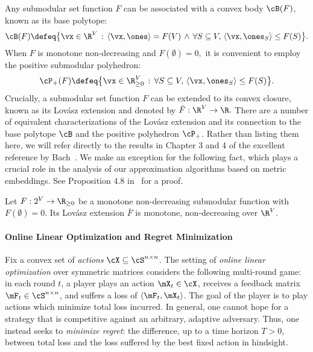 \documentclass[letterpaper]{article}
\begin{document}
Any submodular set function $F$ can be associated with a convex body $\cB(F)$, known as its base polytope:
\begin{equation}
\label{eq.base-polytope-definition}
\cB(F) \defeq \big\{
  \vx \in \R^V \, : \,
  \langle \vx, \ones \rangle = F(V) \, \wedge \,  \forall S \subseteq V,\,
  \langle \vx, \ones_S \rangle \leq F(S)
\big\}.
\end{equation}
When $F$ is monotone non-decreasing and $F(\emptyset) = 0,$ it is convenient to employ the positive submodular polyhedron:
\begin{equation*}
\cP_+(F) \defeq \big\{
  \vx \in \R^V_{\geq 0} \, : \, \forall S \subseteq V,\,
  \langle \vx, \ones_S \rangle \leq F(S) \big\}.
\end{equation*}
Crucially, a submodular set function $F$ can be extended to its convex closure, known as its Lov\'{a}sz extension and denoted by $\bar{F} : \R^V \rightarrow \R.$
There are a number of equivalent characterizations of the Lov\'{a}sz extension and its connection to the base polytope $\cB$ and the positive polyhedron $\cP_+$. Rather than listing them here, we will refer directly to the results in Chapter 3 and 4 of the excellent reference by Bach~\cite{bach2013learning}. We make an exception for the following fact, which plays a crucial role in the analysis of our approximation algorithms based on metric embeddings. See Proposition 4.8 in~\cite{bach2013learning} for a proof.
\begin{fact}\label{fct.lovaszmonotone}
Let $F: 2^V \to \R_{\geq 0}$ be a monotone non-decreasing submodular function with $F(\emptyset) = 0$. Its Lov\'asz extension $\bar{F}$ is monotone, non-decreasing over $\R^V.$
\end{fact}


\paragraph{Online Linear Optimization and Regret Minimization}
Fix a convex set of \emph{actions} $\cX \subseteq \cS^{n \times n}$. The setting of \emph{online linear optimization} over symmetric matrices considers the following multi-round game: in each round $t$, a player plays an action $\mX_t \in \cX$, receives a feedback matrix $\mF_t \in \cS^{n \times n}$, and suffers a loss of $\langle \mF_t, \mX_t \rangle$. The goal of the player is to play actions which minimize total loss incurred. In general, one cannot hope for a strategy that is competitive against an arbitrary, adaptive adversary. Thus, one instead seeks to \emph{minimize regret}: the difference, up to a time horizon $T > 0$, between total loss and the loss suffered by the best fixed action in hindsight.
\end{document}

